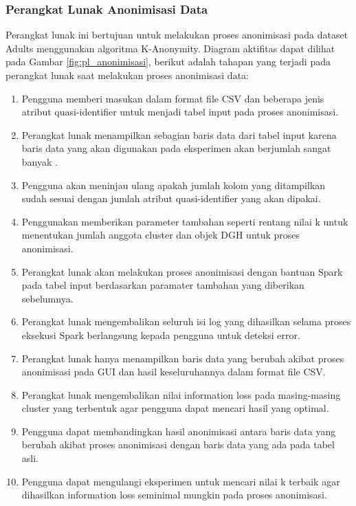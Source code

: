 \subsubsection{Perangkat Lunak Anonimisasi Data}
Perangkat lunak ini bertujuan untuk melakukan proses anonimisasi pada dataset Adults menggunakan algoritma K-Anonymity. Diagram aktifitas dapat dilihat pada Gambar \ref{fig:pl_anonimisasi}, berikut adalah tahapan yang terjadi pada perangkat lunak saat melakukan proses anonimisasi data:

\begin{enumerate}

\item Pengguna memberi masukan dalam format file CSV dan beberapa jenis atribut quasi-identifier untuk menjadi tabel input pada proses anonimisasi.

\item Perangkat lunak menampilkan sebagian baris data dari tabel input karena baris data yang akan digunakan pada eksperimen akan berjumlah sangat banyak .

\item Pengguna akan meninjau ulang apakah jumlah kolom yang ditampilkan sudah sesuai dengan jumlah atribut quasi-identifier yang akan dipakai.

\item Penggunakan memberikan parameter tambahan seperti rentang nilai k untuk menentukan jumlah anggota cluster dan objek DGH untuk proses anonimisasi.

\item Perangkat lunak akan melakukan proses anonimisasi dengan bantuan Spark pada tabel input berdasarkan paramater tambahan yang diberikan sebelumnya. 

\item Perangkat lunak mengembalikan seluruh isi log yang dihasilkan selama proses eksekusi Spark berlangsung kepada pengguna untuk deteksi error.

\item Perangkat lunak hanya menampilkan baris data yang berubah akibat proses anonimisasi pada GUI dan hasil keseluruhannya dalam format file CSV.

\item Perangkat lunak mengembalikan nilai information loss pada masing-masing cluster yang terbentuk agar pengguna dapat mencari hasil yang optimal.

\item Pengguna dapat membandingkan hasil anonimisasi antara baris data yang berubah akibat proses anonimisasi dengan baris data yang ada pada tabel asli.

\item Pengguna dapat mengulangi eksperimen untuk mencari nilai k terbaik agar dihasilkan information loss seminimal mungkin pada proses anonimisasi.


 
\end{enumerate}

